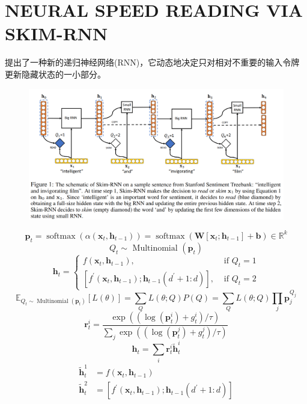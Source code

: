 \documentclass[a4paper,UTF8]{article}
\numberwithin{equation}{section}
\begin{document}
\section{NEURAL SPEED READING VIA SKIM-RNN}
提出了一种新的递归神经网络(RNN)，它动态地决定只对相对不重要的输入令牌更新隐藏状态的一小部分。
\begin{figure}[H]
	\centering
	\includegraphics[width=\textwidth]{9-1.png}
\end{figure}
$$
\mathbf{p}_{t}=\operatorname{softmax}\left(\alpha\left(\mathbf{x}_{t}, \mathbf{h}_{t-1}\right)\right)=\operatorname{softmax}\left(\mathbf{W}\left[\mathbf{x}_{t} ; \mathbf{h}_{t-1}\right]+\mathbf{b}\right) \in \mathbb{R}^{k}
$$
$$
Q_{t} \sim \text { Multinomial }\left(\mathbf{p}_{t}\right)
$$
$$
\mathbf{h}_{t}=\left\{\begin{array}{ll}{f\left(\mathbf{x}_{t}, \mathbf{h}_{t-1}\right),} & {\text { if } Q_{t}=1} \\ {\left[f^{\prime}\left(\mathbf{x}_{t}, \mathbf{h}_{t-1}\right) ; \mathbf{h}_{t-1}\left(d^{\prime}+1 : d\right)\right],} & {\text { if } Q_{t}=2}\end{array}\right.
$$
$$
\mathbb{E}_{Q_{t} \sim \operatorname{Multinomial}\left(\mathbf{p}_{t}\right)}[L(\theta)]=\sum_{Q} L(\theta ; Q) P(Q)=\sum_{Q} L(\theta ; Q) \prod_{j} \mathbf{p}_{j}^{Q_{j}}
$$
$$
\mathbf{r}_{t}^{i}=\frac{\exp \left(\left(\log \left(\mathbf{p}_{t}^{i}\right)+g_{t}^{i}\right) / \tau\right)}{\sum_{j} \exp \left(\left(\log \left(\mathbf{p}_{t}^{j}\right)+g_{t}^{j}\right) / \tau\right)}
$$
$$
\mathbf{h}_{t}=\sum_{i} \mathbf{r}_{t}^{i} \tilde{\mathbf{h}}_{t}^{i}
$$
$$
\begin{aligned} \tilde{\mathbf{h}}_{t}^{1} &=f\left(\mathbf{x}_{t}, \mathbf{h}_{t-1}\right) \\ \tilde{\mathbf{h}}_{t}^{2} &=\left[f^{\prime}\left(\mathbf{x}_{t}, \mathbf{h}_{t-1}\right) ; \mathbf{h}_{t-1}\left(d^{\prime}+1 : d\right)\right] \end{aligned}
$$
\newpage
\end{document}
